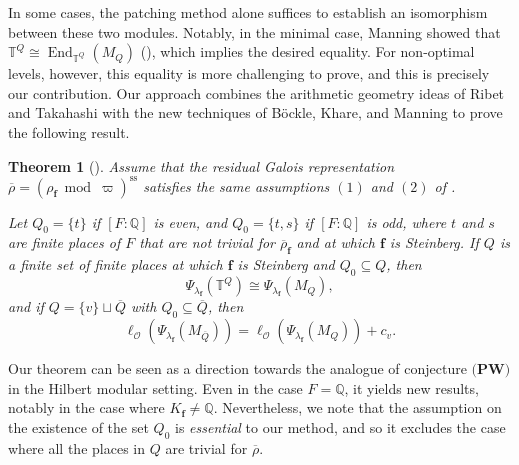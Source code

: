 \documentclass[a4paper, notitlepage, 10pt]{amsart}
\theoremstyle{plain} %
\newtheorem{maintheorem}{Theorem}
\theoremstyle{definition} %
\theoremstyle{remark} %
\numberwithin{equation}{section}
\newcommand{\bbQ}{\mathbb Q}
\newcommand{\bbT}{\mathbb T}
\newcommand{\End}{\operatorname{End}} %
\begin{document}
In some cases, the patching method alone suffices to establish an isomorphism between these two modules. Notably, in the minimal case, Manning showed that $\bbT^Q\cong \End_{\bbT^Q}(M_Q)$ (\cite[Theorem 1.2]{Man21}), which implies the desired equality. For non-optimal levels, however, this equality is more challenging to prove, and this is precisely our contribution. Our approach combines the arithmetic geometry ideas of Ribet and Takahashi with the new techniques of Böckle, Khare, and Manning to prove the following result.

\begin{maintheorem}[]\label{maintheorem}
    Assume that the residual Galois representation $\overline{\rho}=(\rho_{\mathbf{f}} \bmod \varpi)^{\text{ss}}$ satisfies  the same assumptions $(1)$ and $(2)$ of .
    
Let $Q_0=\{t\}$ if $[F:\bbQ]$ is even, and $Q_0=\{t,s\}$ if $[F:\bbQ]$ is odd, where $t$ and $s$ are finite places of $F$ that are not trivial for $\overline{\rho}_{\mathbf{f}}$ and at which $\mathbf{f}$ is Steinberg. 
If $Q$ is a finite set of finite places at which $\mathbf{f}$ is Steinberg and $Q_0\subseteq Q$, then 
$$\Psi_{\lambda_{\mathbf{f}}}(\bbT^Q)\cong \Psi_{\lambda_{\mathbf{f}}}(M_Q),$$ and if $Q=\{v\}\sqcup\overline{Q}$ with $Q_0\subseteq \overline{Q}$, then
$$ \ell_{\mathcal{O}}(\Psi_{\lambda_{\mathbf{f}}}(M_{\overline{Q}}))=\ell_{\mathcal{O}}(\Psi_{\lambda_{\mathbf{f}}}(M_Q))+c_v. $$
\end{maintheorem}
Our theorem can be seen as a direction towards the analogue of conjecture $\textbf{(PW)}$ in the Hilbert modular setting. Even in the case $F=\bbQ$, it yields new results, notably in the case where $K_{\mathbf{f}}\neq \bbQ$. Nevertheless, we note that the assumption on the existence of the set $Q_0$ is \emph{essential} to our method, and so it excludes the case where all the places in $Q$ are trivial for $\overline{\rho}$.
\end{document}

